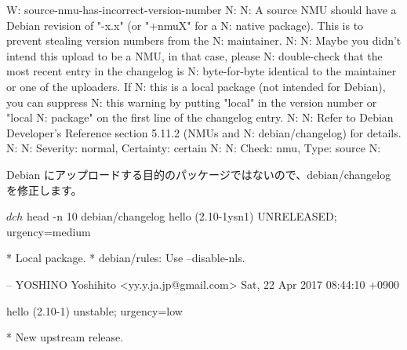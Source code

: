 \documentclass[mingoth,a4paper]{jsarticle}
\begin{document}
\begin{commandline}
W: source-nmu-has-incorrect-version-number
N:
N:   A source NMU should have a Debian revision of "-x.x" (or "+nmuX" for a
N:   native package). This is to prevent stealing version numbers from the
N:   maintainer.
N:   
N:   Maybe you didn't intend this upload to be a NMU, in that case, please
N:   double-check that the most recent entry in the changelog is
N:   byte-for-byte identical to the maintainer or one of the uploaders. If
N:   this is a local package (not intended for Debian), you can suppress
N:   this warning by putting "local" in the version number or "local
N:   package" on the first line of the changelog entry.
N:   
N:   Refer to Debian Developer's Reference section 5.11.2 (NMUs and
N:   debian/changelog) for details.
N:   
N:   Severity: normal, Certainty: certain
N:   
N:   Check: nmu, Type: source
N:
\end{commandline}

Debian にアップロードする目的のパッケージではないので、debian/changelogを修正します。

\begin{commandline}
$ dch
$ head -n 10 debian/changelog
hello (2.10-1ysn1) UNRELEASED; urgency=medium

  * Local package.
  * debian/rules: Use --disable-nls.

 -- YOSHINO Yoshihito <yy.y.ja.jp@gmail.com>  Sat, 22 Apr 2017 08:44:10 +0900

hello (2.10-1) unstable; urgency=low

  * New upstream release.
\end{commandline}
\end{document}
